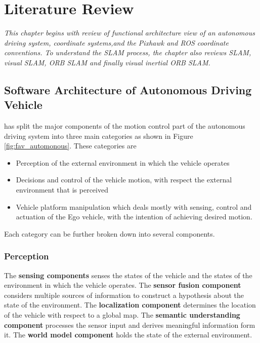 \setlength{\footskip}{8mm}

\chapter{Literature Review} 
\label{ch:literature-review}

\textit{ This chapter begins with review of functional architecture view of an autonomous driving system, coordinate systems,and the Pixhawk and ROS coordinate conventions. To understand the SLAM process, the chapter also reviews SLAM, visual SLAM, ORB SLAM and finally visual inertial ORB SLAM.} 

\section{Software Architecture of Autonomous Driving Vehicle}
\label{section-name-in-literature-review}

 has split the major components of the motion control part of the autonomous driving system into three main categories as shown in Figure \ref{fig:fav_automonous}. These categories are

\begin{itemize}
	\item Perception of the external environment in which the vehicle operates
	\item Decisions and control of the vehicle motion, with respect the external environment that is perceived
	\item Vehicle platform manipulation which deals mostly with sensing, control and actuation of the Ego vehicle, with the intention of achieving desired motion.
\end {itemize}

Each category can be further broken down into several components.

\subsection{Perception}

The \textbf{sensing components} senses the states of the vehicle and the states of the environment in which the vehicle operates. The \textbf{sensor fusion component} considers multiple sources of information to construct a hypothesis about the state of the environment. The \textbf{localization component} determines the location of the vehicle with respect to a global map. The \textbf{semantic understanding component} processes the sensor input and derives meaningful information form it. The \textbf{world model component} holds the state of the external environment.


